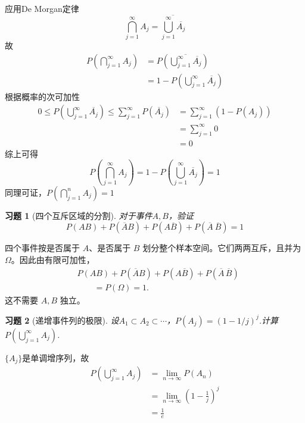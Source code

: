 \documentclass[UTF8,12pt,a4paper,fontset=fandol]{ctexart}
\newtheorem{exercise}{习题}[section]
\begin{document}
\begin{solve}\label{a:Y1.18}
应用De Morgan定律
\[\bigcap\limits_{j = 1}^\infty  {{A_j}}  = \overline {\bigcup\limits_{j = 1}^\infty  {\overline {{A_j}} } } \]
故
\[\begin{aligned}P(\bigcap\limits_{j = 1}^\infty  {{A_j}} ) &= P(\overline {\bigcup\limits_{j = 1}^\infty  {\overline {{A_j}} } } ) \\&= 1 - P(\bigcup\limits_{j = 1}^\infty  {\overline {{A_j}} } )\end{aligned}\]
根据概率的次可加性
\[\begin{aligned}0 \leqslant P(\bigcup\limits_{j = 1}^\infty  {\overline {{A_j}} } ) \leqslant \sum\limits_{j = 1}^\infty  {P(\overline {{A_j}} )}  &= \sum\limits_{j = 1}^\infty  {(1 - P({A_j}))}  \\&= \sum\limits_{j = 1}^\infty  0\\&=0 \end{aligned}\]
综上可得
\[P(\bigcap\limits_{j = 1}^\infty  {{A_j}} ) = 1 - P(\bigcup\limits_{j = 1}^\infty  {\overline {{A_j}} } ) = 1\]
同理可证，$P(\bigcap\limits_{j = 1}^n {{A_j}} ) = 1$
\end{solve}

\begin{exercise}[四个互斥区域的分割]\label{q:Y1.19}
对于事件$A,B$，验证
\[
P(AB)+P(\overline{A}B)+P(A\overline{B})+P(\overline{A}\:\overline{B})=1
\]\par{}
\end{exercise}

\begin{solve}\label{a:Y1.19}四个事件按是否属于 $A$、是否属于 $B$ 划分整个样本空间。它们两两互斥，且并为 $\Omega$。因此由有限可加性，\[\begin{aligned}&P(AB)+P(\overline AB)+P(A\overline B)+P(\overline A\,\overline B)\\&\qquad=P(\Omega)=1.\end{aligned}\]这不需要 $A,B$ 独立。\end{solve}

\begin{exercise}[递增事件列的极限]\label{q:Y1.20}
设$A_1\subset A_2\subset \cdots$，$P(A_j)=(1-1/j)^j$.计算$P(\bigcup\limits_{j = 1}^\infty  {{A_j}} )$.\par{}
\end{exercise}

\begin{solve}\label{a:Y1.20}
$\{A_j\}$是单调增序列，故
\[\begin{aligned}
P(\bigcup\limits_{j = 1}^\infty  {{A_j}} ) &= \mathop {\lim }\limits_{n \to \infty } P({A_n}) \\&= \mathop {\lim }\limits_{n \to \infty } {(1 - \frac{1}{j})^j} \\&= \frac{1}{e}
\end{aligned}\]
\end{solve}
\end{document}
